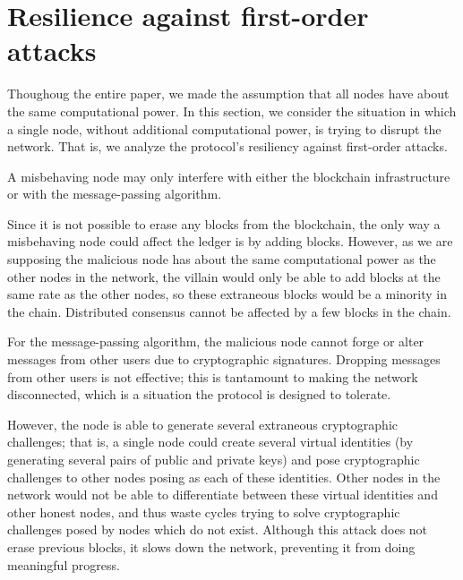 \section{Resilience against first-order attacks}
\label{sec:first-order-attacks}

Thoughoug the entire paper,
we made the assumption that all nodes have about the same computational power.
In this section,
we consider the situation in which a single node,
without additional computational power,
is trying to disrupt the network.
That is,
we analyze the protocol's resiliency against first-order attacks.

A misbehaving node may only interfere with either the blockchain infrastructure
or with the message-passing algorithm.

Since it is not possible to erase any blocks from the blockchain,
the only way a misbehaving node could affect the ledger
is by adding blocks.
However,
as we are supposing the malicious node
has about the same computational power as the other nodes in the network,
the villain would only be able to add blocks at the same rate as the other nodes,
so these extraneous blocks would be a minority in the chain.
Distributed consensus cannot be affected by a few blocks in the chain.

For the message-passing algorithm,
the malicious node cannot forge or alter messages from other users
due to cryptographic signatures.
Dropping messages from other users is not effective;
this is tantamount to making the network disconnected,
which is a situation the protocol is designed to tolerate.

However,
the node is able to generate several extraneous cryptographic challenges;
that is,
a single node could create several virtual identities
(by generating several pairs of public and private keys)
and pose cryptographic challenges to other nodes posing as each of these identities.
Other nodes in the network would not be able to differentiate between
these virtual identities and other honest nodes,
and thus waste cycles trying to solve cryptographic challenges
posed by nodes which do not exist.
Although this attack does not erase previous blocks,
it slows down the network,
preventing it from doing meaningful progress.
